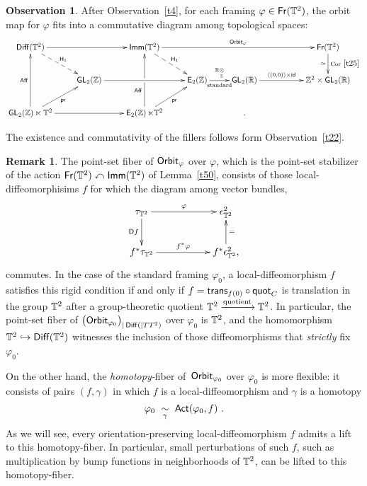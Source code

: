 \documentclass{amsart}
\theoremstyle{definition}
\newtheorem{observation}[theorem]{Observation}
\newtheorem{remark}[theorem]{Remark}
\theoremstyle{remark}
\DeclareMathOperator{\pr}{\mathsf{pr}}
\newcommand{\racts}{\curvearrowleft}
\DeclareMathOperator{\Diff}{{\sf Diff}}
\def\ot{\otimes}
\newcommand{\lag}{\langle}
\newcommand{\rag}{\rangle}
\newcommand{\xra}{\xrightarrow}
\def\sE{\mathsf E}\def\sF{\mathsf F}\def\sG{\mathsf G}\def\sH{\mathsf H}
\DeclareMathOperator{\GL}{\sf GL}
\DeclareMathOperator{\Fr}{\sf Fr}
\DeclareMathOperator{\id}{\sf id}
\DeclareMathOperator{\Act}{\sf Act}
\DeclareMathOperator{\Imm}{\sf Imm}
\DeclareMathOperator{\Aff}{\sf Aff}
\DeclareMathOperator{\EZ}{\sE_2(\ZZ)}
\begin{document}
\begin{observation}
\label{t33}
After Observation~\ref{t4}, for each framing $\varphi \in \Fr(\TT^2)$, 
the orbit map for $\varphi$ fits into a commutative diagram among topological spaces:
\begin{equation*}%
\xymatrix{
\Diff(\TT^2) 
\ar[rr]
\ar@{-->}[dr]^-{\sH_1}
&&
\Imm(\TT^2)
\ar[rrrr]^-{{\sf Orbit}_\varphi}
\ar@{-->}[dr]^-{\sH_1}
&&
&&
\Fr(\TT^2)
\ar[d]^-{{\rm Cor}~\ref{t25}}_-{\simeq}
\\
&
\GL_2(\ZZ) 
\ar[rr] 
&&
\EZ
\ar[r]^-{\RR\underset{\ZZ}\ot }_-{\rm standard}
&
\GL_2(\RR)
\ar[rr]^-{ \lag (0,0) \rag \times \id}
&&
\ZZ^2 \times \GL_2(\RR)
\\
\GL_2(\ZZ) \ltimes \TT^2
\ar[uu]^-{\Aff}
\ar[rr]
\ar[ur]_-{\pr}
&&
\EZ \ltimes \TT^2
\ar[uu]^(.35){\Aff} | \hole
\ar[ur]_-{\pr}
&&
.
}
\end{equation*}

The existence and commutativity of the fillers follows form Observation~\ref{t22}.

\end{observation}

\begin{remark}
\label{r5}
The point-set fiber of ${\sf Orbit}_{\varphi}$ over $\varphi$, which is the point-set stabilizer of the action $\Fr(\TT^2) \racts \Imm(\TT^2)$ of Lemma~\ref{t50}, 
consists of those local-diffeomorphisims $f$ for which the diagram among vector bundles, 
\[
\xymatrix{
\tau_{\TT^2}
\ar[rr]^-{\varphi}
\ar[d]_-{\sD f}
&&
\epsilon^2_{\TT^2}
\\
f^\ast 
\tau_{\TT^2}
\ar[rr]^-{f^\ast \varphi}
&&
f^\ast
\epsilon^2_{\TT^2}
\ar[u]_-=
,
}
\]
commutes.
In the case of the standard framing $\varphi_0$, a local-diffeomorphism $f$ satisfies this rigid condition if and only if $f = {\sf trans}_{f(0)} \circ {\sf quot}_C$ is translation in the group $\mathbb T^2$ after a group-theoretic quotient $\TT^2 \xra{\rm quotient} \TT^2$. 
In particular, the point-set fiber of $\bigl( {\sf Orbit}_{\varphi_0} \bigr)_{|\Diff(|TT^2)}$ over $\varphi_0$ is $\mathbb T^2$, and the homomorphism $\TT^2 \hookrightarrow \Diff(\TT^2)$ witnesses the inclusion of those diffeomorphisms that \emph{strictly} fix $\varphi_0$.  


On the other hand, the \emph{homotopy-}fiber of~${\sf Orbit}_{\varphi_0}$ over $\varphi_0$ is more flexible: 
it consists of pairs $(f, \gamma)$ in which $f$ is a local-diffeomorphism and $\gamma$ is a homotopy 
\[
\varphi_0
~ \underset{\gamma}\sim ~
\Act(\varphi_0,f)
~.
\]
As we will see, every orientation-preserving local-diffeomorphism $f$ admits a lift to this homotopy-fiber.  
In particular, small perturbations of such $f$, such as multiplication by bump functions in neighborhoods of $\mathbb T^2$, can be lifted to this homotopy-fiber.
\end{remark}
\end{document}

